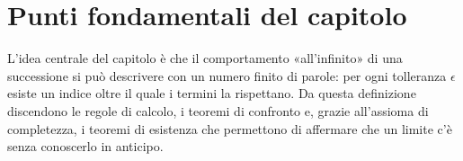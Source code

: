 \section{Punti fondamentali del capitolo}
\label{sec:sintesi-cap03}

L'idea centrale del capitolo è che il comportamento «all'infinito» di una successione si
può descrivere con un numero finito di parole: per ogni tolleranza $\epsilon$ esiste un
indice oltre il quale i termini la rispettano. Da questa definizione discendono le regole
di calcolo, i teoremi di confronto e, grazie all'assioma di completezza, i teoremi di
esistenza che permettono di affermare che un limite c'è senza conoscerlo in anticipo.

